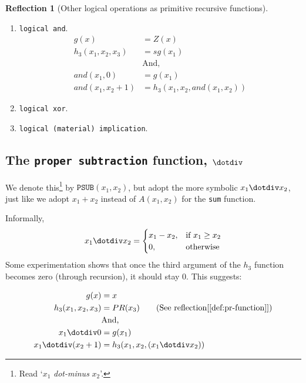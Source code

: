 \documentclass[11pt]{book}
\theoremstyle{definition}
\theoremstyle{plain}
\theoremstyle{problemstyle}
\theoremstyle{remark}
\theoremstyle{definition}
\newtheorem{reflection}{Reflection}
\begin{document}
\begin{reflection}[Other logical operations as primitive recursive functions]
\begin{enumerate}
        \item \texttt{logical and}. 
            \begin{equation}
                \label{eq:logical-and}
                \begin{aligned}
                    g(x)&=Z(x)\\
                    h_3(x_1,x_2,x_3)&=sg(x_1)\\
                    &\text{And,}\\
                    and(x_1,0)&=g(x_1)\\
                    and(x_1,x_2+1)&=h_3(x_1,x_2,and(x_1,x_2))
                \end{aligned}
            \end{equation}
        \item \texttt{logical xor}. 
        \item \texttt{logical (material) implication}. 
    \end{enumerate}
\end{reflection}

\subsection*{The \texttt{proper subtraction} function, $\dotdiv$}
\label{ss:psub}
We denote this\footnote{Read `$x_1$ \emph{dot-minus} $x_2$'.} by $\texttt{PSUB}(x_1,x_2)$, but adopt the more symbolic $x_1\dotdiv x_2$, just like we adopt $x_1+x_2$ instead of $A(x_1,x_2)$ for the \texttt{sum} function.

Informally, 
    \[ 
    x_1\dotdiv x_2=
        \begin{cases}
            x_1-x_2, & \text{if $x_1\geq x_2$}\\
            0, & \text{otherwise}
		 \end{cases}
    \]
Some experimentation shows that once the third argument of the $h_3$ function becomes zero (through recursion), it should stay $0$. This suggests:

            \begin{equation}
                \label{eq:proper-subtraction}
                \begin{aligned}
                    g(x)&=x\\
                    h_3(x_1,x_2,x_3)&=PR(x_3)\quad\quad\text{(See reflection[\ref{def:pr-function}])}\\
                    &\text{And,}\\
                    x_1\dotdiv 0&=g(x_1)\\
                    x_1\dotdiv (x_2+1)&=h_3(x_1,x_2,(x_1\dotdiv x_2))
                \end{aligned}
            \end{equation}
\end{document}
